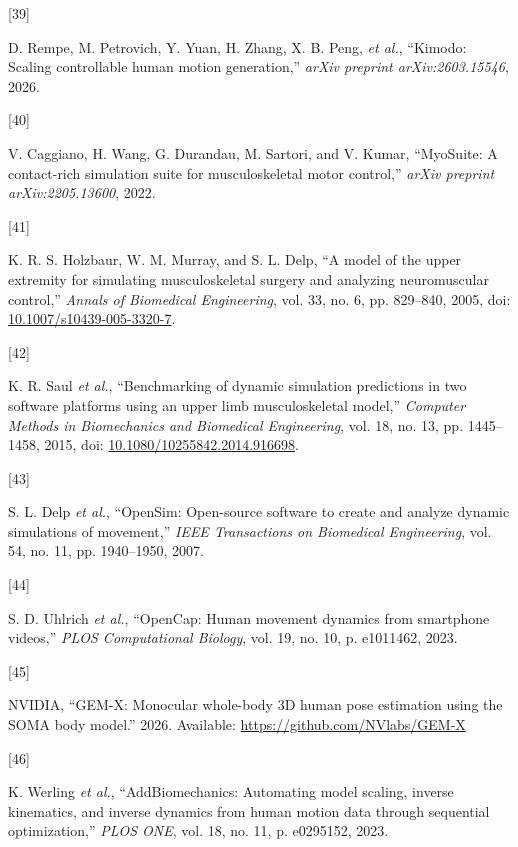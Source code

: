 \documentclass[
  11pt,
]{article}
\newlength{\cslhangindent}
\newlength{\csllabelwidth}
\newenvironment{CSLReferences}[2] %
 {\begin{list}{}{%
  \setlength{\itemindent}{0pt}
  \setlength{\leftmargin}{0pt}
  \setlength{\parsep}{0pt}
  \ifodd #1
   \setlength{\leftmargin}{\cslhangindent}
   \setlength{\itemindent}{-1\cslhangindent}
  \fi
  \setlength{\itemsep}{#2\baselineskip}}}
 {\end{list}}
\newcommand{\CSLLeftMargin}[1]{\parbox[t]{\csllabelwidth}{\strut#1\strut}}
\newcommand{\CSLRightInline}[1]{\parbox[t]{\linewidth - \csllabelwidth}{\strut#1\strut}}
\begin{document}
\begin{CSLReferences}{0}{0}
\CSLLeftMargin{{[}39{]} }%
\CSLRightInline{{D. Rempe, M. Petrovich, Y. Yuan, H. Zhang, X. B. Peng,
\emph{et al.}}, {``{Kimodo}: Scaling controllable human motion
generation,''} \emph{arXiv preprint arXiv:2603.15546}, 2026.}

\CSLLeftMargin{{[}40{]} }%
\CSLRightInline{V. Caggiano, H. Wang, G. Durandau, M. Sartori, and V.
Kumar, {``{MyoSuite}: A contact-rich simulation suite for
musculoskeletal motor control,''} \emph{arXiv preprint
arXiv:2205.13600}, 2022.}

\CSLLeftMargin{{[}41{]} }%
\CSLRightInline{K. R. S. Holzbaur, W. M. Murray, and S. L. Delp, {``A
model of the upper extremity for simulating musculoskeletal surgery and
analyzing neuromuscular control,''} \emph{Annals of Biomedical
Engineering}, vol. 33, no. 6, pp. 829--840, 2005, doi:
\href{https://doi.org/10.1007/s10439-005-3320-7}{10.1007/s10439-005-3320-7}.}

\CSLLeftMargin{{[}42{]} }%
\CSLRightInline{K. R. Saul \emph{et al.}, {``Benchmarking of dynamic
simulation predictions in two software platforms using an upper limb
musculoskeletal model,''} \emph{Computer Methods in Biomechanics and
Biomedical Engineering}, vol. 18, no. 13, pp. 1445--1458, 2015, doi:
\href{https://doi.org/10.1080/10255842.2014.916698}{10.1080/10255842.2014.916698}.}

\CSLLeftMargin{{[}43{]} }%
\CSLRightInline{S. L. Delp \emph{et al.}, {``{OpenSim}: Open-source
software to create and analyze dynamic simulations of movement,''}
\emph{IEEE Transactions on Biomedical Engineering}, vol. 54, no. 11, pp.
1940--1950, 2007.}

\CSLLeftMargin{{[}44{]} }%
\CSLRightInline{S. D. Uhlrich \emph{et al.}, {``{OpenCap}: Human
movement dynamics from smartphone videos,''} \emph{PLOS Computational
Biology}, vol. 19, no. 10, p. e1011462, 2023.}

\CSLLeftMargin{{[}45{]} }%
\CSLRightInline{NVIDIA, {``{GEM-X}: Monocular whole-body {3D} human pose
estimation using the {SOMA} body model.''} 2026. Available:
\url{https://github.com/NVlabs/GEM-X}}

\CSLLeftMargin{{[}46{]} }%
\CSLRightInline{K. Werling \emph{et al.}, {``{AddBiomechanics}:
Automating model scaling, inverse kinematics, and inverse dynamics from
human motion data through sequential optimization,''} \emph{PLOS ONE},
vol. 18, no. 11, p. e0295152, 2023.}


\end{CSLReferences}
\end{document}
